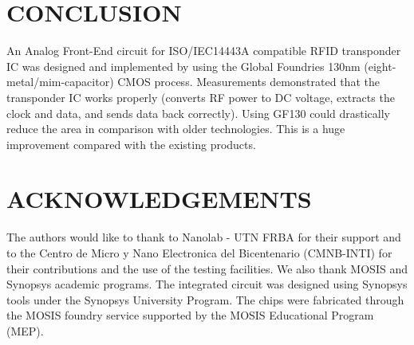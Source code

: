 \documentclass[a4paper, 10pt, conference]{ieeeconf}      %
\begin{document}
\section{CONCLUSION}
An Analog Front-End circuit for ISO/IEC14443A compatible
RFID transponder IC was designed and implemented by using
the Global Foundries 130nm (eight-metal/mim-capacitor)
CMOS process. Measurements demonstrated that the
transponder IC works properly (converts RF power to DC
voltage, extracts the clock and data, and  sends data back correctly). Using GF130 could drastically reduce the area
in comparison with older technologies. This is a huge
improvement compared with the existing products.


\section{ACKNOWLEDGEMENTS}
The authors would like to thank to Nanolab - UTN FRBA for their support and to the Centro de Micro y Nano Electronica del Bicentenario (CMNB-INTI) \cite{inti} for their contributions and the use of the testing facilities. We also thank MOSIS and Synopsys academic programs. The integrated circuit was designed using Synopsys \cite{synopsys} tools under the Synopsys University Program. The chips were fabricated through the MOSIS foundry service supported by the MOSIS Educational Program (MEP).
\end{document}
